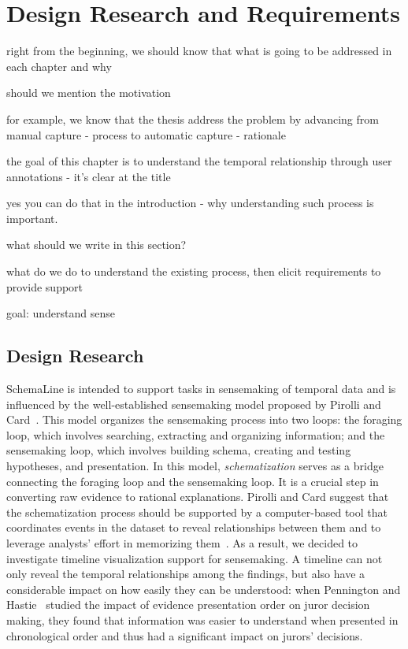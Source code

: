 \section{Design Research and Requirements}

right from the beginning, we should know that what is going to be addressed in each chapter and why

should we mention the motivation 

for example, we know that the thesis address the problem by advancing from manual capture - process to automatic capture - rationale

the goal of this chapter is to understand the temporal relationship through user annotations - it's clear at the title

yes you can do that in the introduction - why understanding such process is important.

what should we write in this section?

what do we do to understand the existing process, then elicit requirements to provide support

goal: understand sense

\subsection{Design Research}
SchemaLine is intended to support tasks in sensemaking of temporal data and is influenced by the well-established sensemaking model proposed by Pirolli and Card~\cite{Pirolli2005}. This model organizes the sensemaking process into two loops: the foraging loop, which involves searching, extracting and organizing information; and the sensemaking loop, which involves building schema, creating and testing hypotheses, and presentation. In this model, \emph{schematization} serves as a bridge connecting the foraging loop and the sensemaking loop. It is a crucial step in converting raw evidence to rational explanations. Pirolli and Card suggest that the schematization process should be supported by a computer-based tool that coordinates events in the dataset to reveal relationships between them and to leverage analysts' effort in memorizing them~\cite{Pirolli2005}. As a result, we decided to investigate timeline visualization support for sensemaking. A timeline can not only reveal the temporal relationships among the findings, but also have a considerable impact on how easily they can be understood: when Pennington and Hastie~\cite{Pennington1991} studied the impact of evidence presentation order on juror decision making, they found that information was easier to understand when presented in chronological order and thus had a significant impact on jurors' decisions. 

